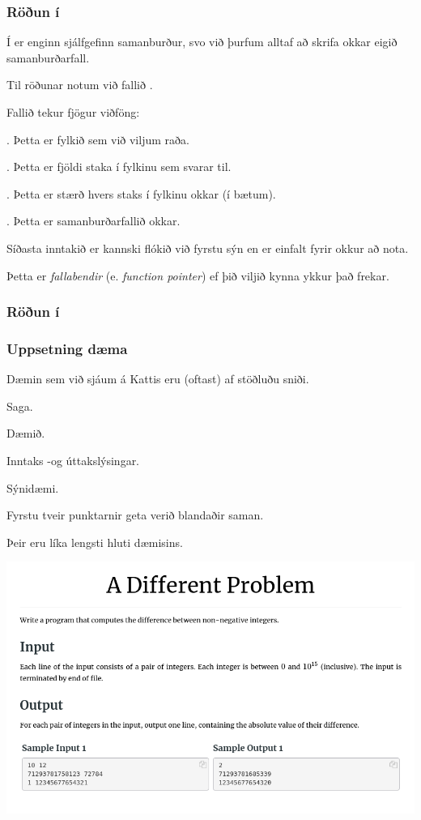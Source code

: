 {
	\frametitle{Röðun í }
	{
		\item<1-> Í  er enginn sjálfgefinn samanburður, svo við þurfum alltaf að skrifa okkar eigið samanburðarfall.
		\item<2-> Til röðunar notum við fallið .
		\item<3-> Fallið tekur fjögur viðföng:
		{
			\item<4-> . Þetta er fylkið sem við viljum raða.
			\item<5-> . Þetta er fjöldi staka í fylkinu sem  svarar til.
			\item<6-> . Þetta er stærð hvers staks í fylkinu okkar (í bætum).
			\item<7-> . Þetta er samanburðarfallið okkar.
		}
		\item<8-> Síðasta inntakið er kannski flókið við fyrstu sýn en er einfalt fyrir okkur að nota.
		\item<9-> Þetta er \emph{fallabendir} (e. \emph{function pointer}) ef þið viljið kynna ykkur það frekar.
	}
}

{
	\frametitle{Röðun í }
}

{
	\frametitle{Uppsetning dæma}
	{
		\item<1-> Dæmin sem við sjáum á Kattis eru (oftast) af stöðluðu sniði.
		{
			\item<2-> Saga.
			\item<3-> Dæmið.
			\item<4-> Inntaks -og úttakslýsingar.
			\item<5-> Sýnidæmi.
		}
		\item<6-> Fyrstu tveir punktarnir geta verið blandaðir saman.
		\item<7-> Þeir eru líka lengsti hluti dæmisins.
	}
}
{
	\includegraphics[scale = 0.38]{fig/daemi}
}

